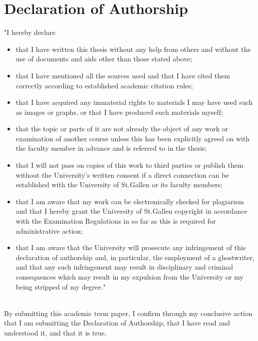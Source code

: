 \documentclass[11pt,a4paper,english,oneside]{book}
\numberwithin{equation}{chapter}
\begin{document}
\newpage
{\pagestyle{firststyle}
	
\chapter*{Declaration of Authorship}

"I hereby declare
\begin{itemize}
	\item that I have written this thesis without any help from others and without the use of
	documents and aids other than those stated above;
	\item that I have mentioned all the sources used and that I have cited them correctly
	according to established academic citation rules;
	\item that I have acquired any immaterial rights to materials I may have used such as images
	or graphs, or that I have produced such materials myself;
	\item that the topic or parts of it are not already the object of any work or examination of
	another course unless this has been explicitly agreed on with the faculty member in
	advance and is referred to in the thesis;
	\item that I will not pass on copies of this work to third parties or publish them without the
	University’s written consent if a direct connection can be established with the
	University of St.Gallen or its faculty members;
	\item that I am aware that my work can be electronically checked for plagiarism and that I
	hereby grant the University of St.Gallen copyright in accordance with the Examination
	Regulations in so far as this is required for administrative action;
	\item that I am aware that the University will prosecute any infringement of this declaration
	of authorship and, in particular, the employment of a ghostwriter, and that any such
	infringement may result in disciplinary and criminal consequences which may result
	in my expulsion from the University or my being stripped of my degree."
\end{itemize}


\vspace*{3cm}


 \hfill {}\\

\vspace*{.5 cm}
\noindent By submitting this academic term paper, I confirm through my conclusive action that I am
submitting the Declaration of Authorship, that I have read and understood it, and that it is
true.
\cleardoublepage
}
\end{document}
